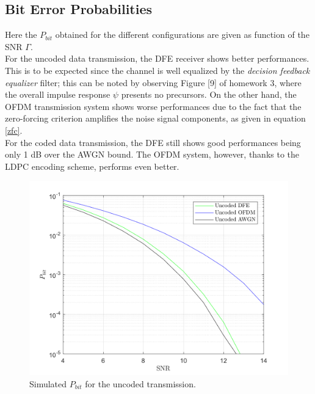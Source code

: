 \documentclass[a4paper, 12pt]{report}
\begin{document}
\subsection*{Bit Error Probabilities}
Here the $P_{bit}$ obtained for the different configurations are given as function of the SNR $\Gamma$. \\
For the uncoded data transmission, the DFE receiver shows better performances. This is to be expected since the channel is well equalized by the \textit{decision feedback equalizer} filter; this can be noted by observing Figure [9] of homework 3, where the overall impulse response $\psi$ presents no precursors. On the other hand, the OFDM transmission system shows worse performances due to the fact that the zero-forcing criterion amplifies the noise signal components, as given in equation \eqref{zfc}. \\
For the coded data transmission, the DFE still shows good performances being only 1 dB over the AWGN bound. The OFDM system, however, thanks to the LDPC encoding scheme, performs even better.  

\begin{figure}[H]
	\centering
	\includegraphics[width=14cm]{uncoded}
	\caption{Simulated $P_{bit}$ for the uncoded transmission.}\label{uncoded}
\end{figure}
\end{document}
